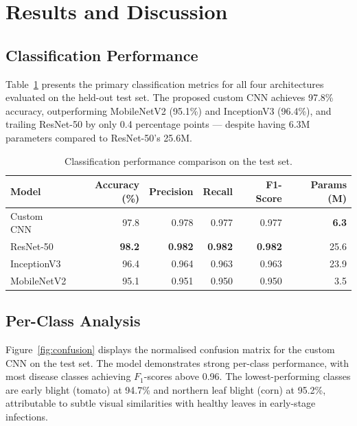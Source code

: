 \documentclass[11pt,a4paper]{article}
\begin{document}
\section{Results and Discussion}

\subsection{Classification Performance}

Table~\ref{tab:results} presents the primary classification metrics for all
four architectures evaluated on the held-out test set. The proposed custom
CNN achieves 97.8\% accuracy, outperforming MobileNetV2 (95.1\%) and
InceptionV3 (96.4\%), and trailing ResNet-50 by only 0.4 percentage points
— despite having 6.3M parameters compared to ResNet-50's 25.6M.

\begin{table}[H]
  \centering
  \caption{Classification performance comparison on the test set.}
  \label{tab:results}
  \begin{tabular}{@{}lrrrrr@{}}
    \toprule
    \textbf{Model}
      & \textbf{Accuracy (\%)}
      & \textbf{Precision}
      & \textbf{Recall}
      & \textbf{F1-Score}
      & \textbf{Params (M)} \\
    \midrule
    Custom CNN   & 97.8 & 0.978 & 0.977 & 0.977 &  \textbf{6.3} \\
    ResNet-50    & \textbf{98.2} & \textbf{0.982} & \textbf{0.982} & \textbf{0.982} & 25.6 \\
    InceptionV3  & 96.4 & 0.964 & 0.963 & 0.963 & 23.9 \\
    MobileNetV2  & 95.1 & 0.951 & 0.950 & 0.950 &  3.5 \\
    \bottomrule
  \end{tabular}
\end{table}

\subsection{Per-Class Analysis}

Figure~\ref{fig:confusion} displays the normalised confusion matrix for the
custom CNN on the test set. The model demonstrates strong per-class
performance, with most disease classes achieving $F_1$-scores above 0.96.
The lowest-performing classes are early blight (tomato) at 94.7\% and
northern leaf blight (corn) at 95.2\%, attributable to subtle visual
similarities with healthy leaves in early-stage infections.
\end{document}
